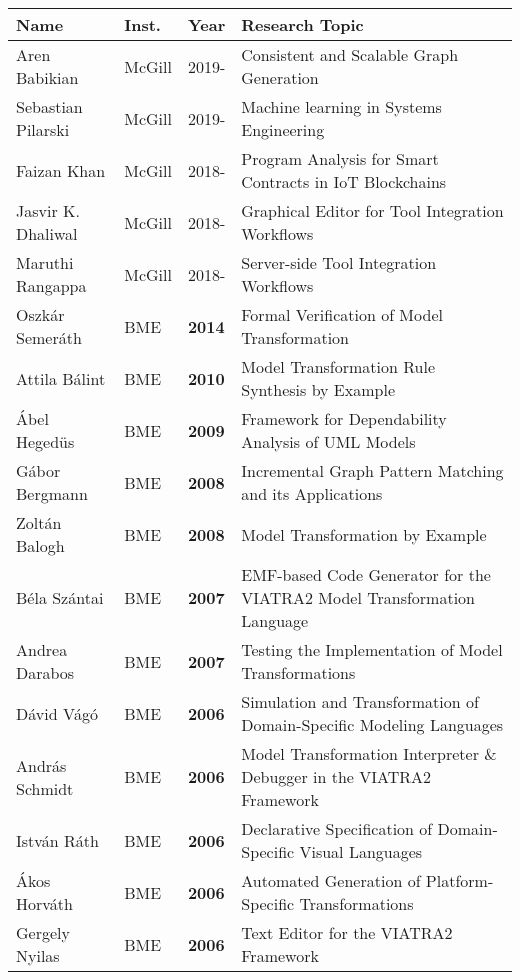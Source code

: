 
\begin{table}[h!]
\footnotesize
\begin{tabular}{@{}lllp{11cm}@{}}
\toprule
\textbf{Name} & \textbf{Inst.} & \textbf{Year} & \textbf{Research Topic} \\ \midrule
Aren Babikian & McGill & 2019-   & Consistent and Scalable Graph Generation \\
Sebastian Pilarski & McGill & 2019- & Machine learning in Systems Engineering \\
Faizan Khan & McGill & 2018-   & Program Analysis for Smart Contracts in IoT Blockchains \\
Jasvir K. Dhaliwal & McGill & 2018-   & Graphical Editor for Tool Integration Workflows \\
Maruthi Rangappa & McGill  & 2018-   & Server-side Tool Integration Workflows \\ \midrule
Oszk\'ar Semer\'ath & BME & \textbf{2014} & Formal Verification of Model Transformation\\ 
Attila B\'alint & BME & \textbf{2010} & Model Transformation Rule Synthesis by Example\\ 
\'Abel Heged\"us & BME & \textbf{2009} & Framework for Dependability Analysis of UML Models\\ 
G\'abor Bergmann & BME  & \textbf{2008} & Incremental Graph Pattern Matching and its Applications\\ 
Zolt\'an Balogh & BME & \textbf{2008} & Model Transformation by Example\\ 
B\'ela Sz\'antai & BME & \textbf{2007} & EMF-based Code Generator for the VIATRA2 Model Transformation Language \\ 
Andrea Darabos & BME & \textbf{2007} & Testing the Implementation of Model Transformations\\ 
D\'avid V\'ag\'o & BME & \textbf{2006} & Simulation and Transformation of Domain-Specific Modeling Languages\\ 
Andr\'as Schmidt & BME & \textbf{2006} & Model Transformation Interpreter \& Debugger in the VIATRA2 Framework\\ 
Istv\'an R\'ath & BME & \textbf{2006} & Declarative Specification of Domain-Specific Visual Languages\\ 
\'Akos Horv\'ath & BME & \textbf{2006} & Automated Generation of Platform-Specific Transformations\\ 
Gergely Nyilas & BME & \textbf{2006} & Text Editor for the VIATRA2 Framework \\ 

\end{tabular}
\end{table}
